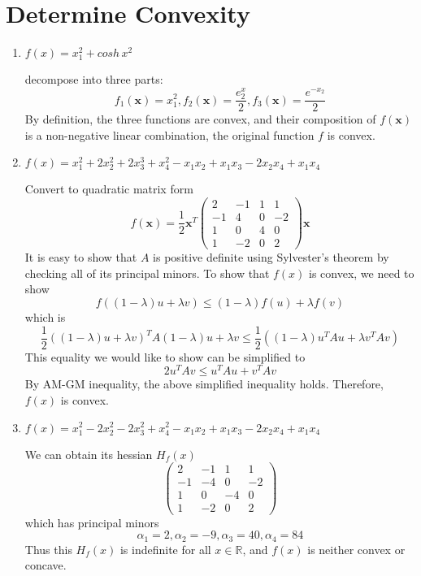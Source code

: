 \section{Determine Convexity}
\begin{enumerate}
\item $f(x) =x_1^2+cosh\,x^2$ \par
decompose into three parts:
\[
f_1(\mathbf{x}) = x_1^2, f_2(\mathbf{x}) = \frac{e^x_2}{2},  f_3(\mathbf{x}) = \frac{e^{-x_2}}{2}
\]
By definition, the three functions are convex, and their composition of $f(\mathbf{x})$ is a non-negative linear combination, the original function $f$ is convex.

\item $f(x) = x_1^2+2x_2^2+2x_3^3+x_4^2-x_1x_2+x_1x_3-2x_2x_4+x_1x_4$ \par
Convert to quadratic matrix form
\[
f(\mathbf{x}) = \frac{1}{2}\mathbf{x}^T
\left(\begin{array}{cccc}
2 & -1 & 1 & 1\\
-1 & 4 & 0 & -2\\
1 & 0 & 4 & 0\\
1 & -2 & 0 & 2
\end{array}\right)\mathbf{x}
\]
It is easy to show that $A$ is positive definite using Sylvester's theorem by checking all of its principal minors. To show that $f(x)$ is convex, we need to show
\[
f((1-\lambda)u+\lambda v) \leq (1-\lambda)f(u)+\lambda f(v)
\]
which is
\[
\frac{1}{2}((1-\lambda)u+\lambda v)^T A (1-\lambda)u+\lambda v \leq \frac{1}{2}( (1-\lambda)u^TAu+\lambda v^TAv)
\]
This equality we would like to show can be simplified to
\[
2u^TAv \leq u^TAu + v^TAv
\]
By AM-GM inequality, the above simplified inequality holds. Therefore, $f(x)$ is convex.



\item $f(x) = x_1^2-2x_2^2-2x_3^2+x_4^2-x_1x_2+x_1x_3-2x_2x_4+x_1x_4$\par
We can obtain its hessian $H_f(x)$
\[
\left(\begin{array}{cccc}
2 & -1 & 1 & 1\\
-1 & -4 & 0 & -2\\
1 & 0 & -4 & 0\\
1 & -2 & 0 & 2
\end{array}\right)
\]
which has principal minors
\[
\alpha_1 = 2, \alpha_2 = -9, \alpha_3=40, \alpha_4=84
\]
Thus this $H_f(x)$ is indefinite for all $x\in\mathbb{R}$, and $f(x)$ is neither convex or concave.


\end{enumerate}
